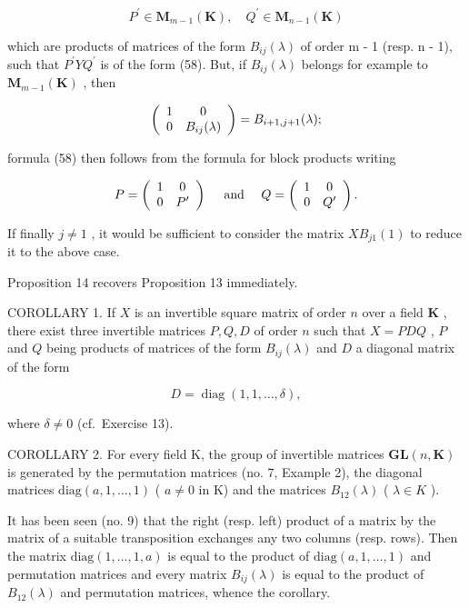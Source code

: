 \[
P ^ {\prime} \in \mathbf {M} _ {m - 1} (\mathbf {K}), \quad Q ^ {\prime} \in \mathbf {M} _ {n - 1} (\mathbf {K})
\]

which are products of matrices of the form \(B_{ij}(\lambda)\) of order m - 1 (resp. n - 1), such that \(P^{\prime}YQ^{\prime}\) is of the form (58). But, if \(B_{ij}(\lambda)\) belongs for example to \(\mathbf{M}_{m-1}(\mathbf{K})\) , then

\[
\left( \begin{array}{c c} 1 & 0 \\ 0 & B _ {i j} (\lambda) \end{array} \right) = B _ {i + 1, j + 1} (\lambda);
\]

formula (58) then follows from the formula for block products writing

\[
P = \left( \begin{array}{c c} 1 & 0 \\ 0 & P ^ {\prime} \end{array} \right) \quad \text { and } \quad Q = \left( \begin{array}{c c} 1 & 0 \\ 0 & Q ^ {\prime} \end{array} \right).
\]

If finally \(j \neq 1\) , it would be sufficient to consider the matrix \(XB_{j1}(1)\) to reduce it to the above case.

Proposition 14 recovers Proposition 13 immediately.

COROLLARY 1. If \(X\) is an invertible square matrix of order \(n\) over a field \(\mathbf{K}\) , there exist three invertible matrices \(P, Q, D\) of order \(n\) such that \(X = PDQ\) , \(P\) and \(Q\) being products of matrices of the form \(B_{ij}(\lambda)\) and \(D\) a diagonal matrix of the form

\[
D = \operatorname{diag} (1, 1, \dots , \delta),
\]

where \(\delta \neq 0\) (cf.~Exercise 13).

COROLLARY 2. For every field K, the group of invertible matrices \(\mathbf{GL}(n,\mathbf{K})\) is generated by the permutation matrices (no. 7, Example 2), the diagonal matrices \(\text{diag}(a,1,\ldots,1)\) ( \(a\neq0\) in K) and the matrices \(B_{12}(\lambda)\) ( \(\lambda\in K\) ).

It has been seen (no. 9) that the right (resp. left) product of a matrix by the matrix of a suitable transposition exchanges any two columns (resp. rows). Then the matrix \(\text{diag}(1, \ldots, 1, a)\) is equal to the product of \(\text{diag}(a, 1, \ldots, 1)\) and permutation matrices and every matrix \(B_{ij}(\lambda)\) is equal to the product of \(B_{12}(\lambda)\) and permutation matrices, whence the corollary.

